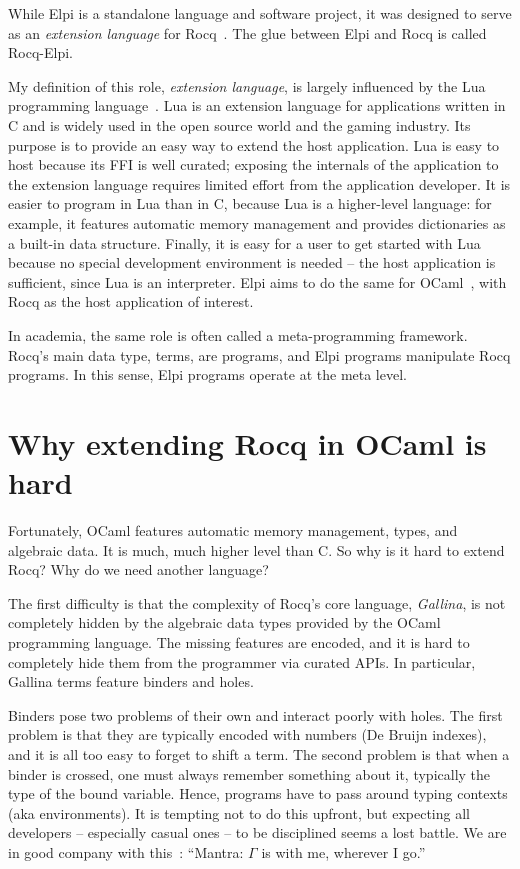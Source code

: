 \documentclass[a4paper, 11pt]{book}
\begin{document}
While Elpi is a standalone language and software project, it was designed to
serve as an \emph{extension language} for Rocq~\cite{Coq-refman}.
The glue between Elpi and Rocq is called Rocq-Elpi.

My definition of this role, \emph{extension language}, is largely influenced by
the Lua programming language~\cite{10.5555/1200583}. Lua is an extension
language for applications written in C and is widely used in the open source
world and the gaming industry. Its purpose is to provide an easy way to extend
the host application. Lua is easy to host because its FFI is well curated;
exposing the internals of the application to the extension language requires
limited effort from the application developer. It is easier to program in Lua
than in C, because Lua is a higher-level language: for example, it features
automatic memory management and provides dictionaries as a built-in data
structure. Finally, it is easy for a user to get started with Lua because no
special development environment is needed -- the host application is sufficient,
since Lua is an interpreter.
Elpi aims to do the same for OCaml~\cite{leroy3ocaml}, with Rocq as the
host application of
interest.

In academia, the same role is often called a meta-programming framework. Rocq's
main data type, terms, are programs, and Elpi programs manipulate Rocq
programs. In this sense, Elpi programs operate at the meta level.


\section{Why extending Rocq in OCaml is hard}

Fortunately, OCaml features automatic memory management, types, and algebraic
data. It is much, much higher level than C. So why is it hard to extend Rocq?
Why do we need another language?

The first difficulty is that the complexity of Rocq's core language,
\emph{Gallina}, is not completely hidden by the algebraic data types
provided by the OCaml
programming language. The missing features are encoded, and it is hard to
completely hide them from the programmer via curated APIs. In particular,
Gallina terms feature binders and holes.

Binders pose two problems of their own and interact poorly with holes. The
first problem is that they are typically encoded with numbers (De Bruijn
indexes), and it is all too easy to forget to shift a term. The second
problem is that when a binder is crossed, one must always remember something
about it, typically the type of the bound variable. Hence, programs have to
pass around typing contexts (aka environments). It is tempting not to do this
upfront, but expecting all developers -- especially casual ones -- to be disciplined
seems a lost battle. We are in good company with this~\cite[page 20]{mcbride}:
``Mantra: $\Gamma$ is with me, wherever I go.''
\end{document}
